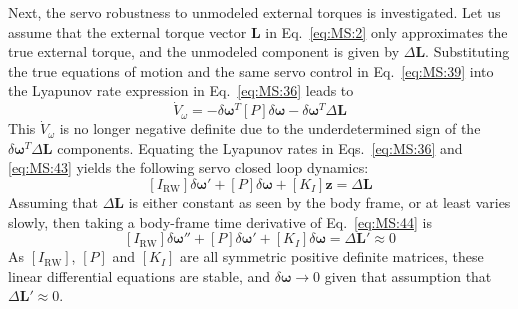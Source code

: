 \documentclass[]{BasiliskReportMemo}
\begin{document}
Next, the servo robustness to unmodeled external torques is investigated.  Let us assume that the external torque vector $\bm L$ in Eq.~\eqref{eq:MS:2} only approximates the true external torque, and the unmodeled component is given by $\Delta \bm L$.  Substituting the true equations of motion and the same servo control in Eq.~\eqref{eq:MS:39} into the Lyapunov rate expression in Eq.~\eqref{eq:MS:36} leads to
\begin{equation}
	\label{eq:MS:43}
	\dot V_{\omega} = - \delta\bm\omega ^{T} [P] \delta\bm\omega - \delta\bm\omega ^{T} \Delta \bm L
\end{equation}
This $\dot V_{\omega}$ is no longer negative definite due to the underdetermined sign of the $\delta\bm\omega ^{T} \Delta \bm L$ components.  Equating the Lyapunov rates in Eqs.~\eqref{eq:MS:36} and \eqref{eq:MS:43} yields the following servo closed loop dynamics:
\begin{equation}
	\label{eq:MS:44}
	[I_{\text{RW}}]\delta\bm\omega' + [P]\delta\bm\omega + [K_{I}]\bm z = \Delta\bm L
\end{equation}
Assuming that $\Delta\bm L$ is either constant as seen by the body frame, or at least varies slowly, then taking a body-frame time derivative of Eq.~\eqref{eq:MS:44} is
\begin{equation}
	\label{eq:MS:45}
	[I_{\text{RW}}]\delta\bm\omega'' + [P]\delta\bm\omega' + [K_{I}]\delta \bm \omega = \Delta\bm L' \approx 0
\end{equation}
As $[I_{\text{RW}}]$, $[P]$ and $[K_{I}]$ are all symmetric positive definite matrices, these linear differential equations are stable, and $\delta\bm\omega\rightarrow0$ given that assumption that $\Delta\bm L' \approx 0$.
\end{document}
